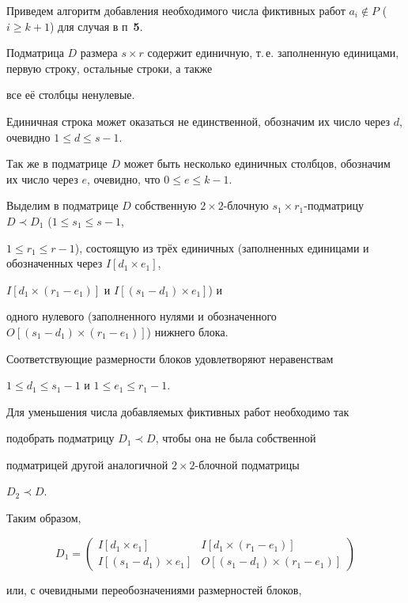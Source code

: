 
Приведем алгоритм добавления необходимого числа фиктивных работ $a_i\notin P$ ($i\geq k+1$) для случая {} в п~{\bf 5}.

Подматрица $D$ размера $s{\times}r$ содержит единичную, т.\,е. заполненную единицами, первую строку, остальные строки, а также

все её столбцы ненулевые. 

Единичная строка может оказаться не единственной, обозначим их число через $d$, очевидно $1\leq d \leq s-1$. 

Так же в подматрице $D$ может быть несколько единичных столбцов, обозначим их число через $e$, очевидно, что $0\leq e \leq k-1$.



Выделим в подматрице  $D$ собственную $2{\times }2$-блочную $s_1{\times} r_1$-подматрицу $D\prec D_1$ ($1\leq s_1\leq s-1$,

$1\leq r_1\leq r-1$), состоящую из трёх единичных (заполненных единицами и обозначенных через $I[d_1\times e_1]$,

$I[d_1\times(r_1- e_1)]$ и $I[(s_1-d_1)\times e_1]$) и

одного нулевого (заполненного нулями и обозначенного $O[(s_1-d_1)\times (r_1-e_1)]$) нижнего блока.

Соответствующие размерности блоков удовлетворяют неравенствам

$1\leq d_1\leq s_1-1$ и $1\leq e_1\leq r_1-1$.



Для уменьшения числа добавляемых фиктивных работ необходимо так

подобрать подматрицу $D_1\prec D$, чтобы она не была собственной

подматрицей другой аналогичной $2{\times }2$-блочной подматрицы

$D_2\prec D$.

Таким образом,

\[

D_1= \begin{pmatrix}

I[d_1\times e_1] & I[d_1\times (r_1-e_1)]  \\

I[(s_1-d_1)\times e_1] & O[(s_1-d_1)\times (r_1-e_1)]

\end{pmatrix}

\]

или, с очевидными переобозначениями размерностей блоков,

